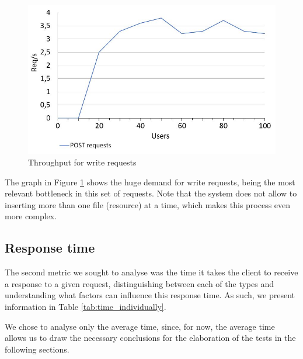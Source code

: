   \begin{figure}[H]
    \centering
    \includegraphics[width=.8\textwidth]{img/performance_evaluation/post_individual.JPG}
    \caption{\label{tab:throughput_write}Throughput for write requests}
  \end{figure}
  
  
  The graph in Figure \ref{tab:throughput_write} shows the huge demand for write requests, being the most relevant bottleneck in this set of requests. Note that the system does not allow to inserting more than one file (resource) at a time, which makes this process even more complex.
  
  
  \subsection{Response time}

  The second metric we sought to analyse was the time it takes the client to receive a response to a given request, distinguishing between each of the types and understanding what factors can influence this response time. As such, we present information in Table \ref{tab:time_individually}.
  
  We chose to analyse only the average time, since, for now, the average time allows us to draw the necessary conclusions for the elaboration of the tests in the following sections.
  
  \newpage
  
